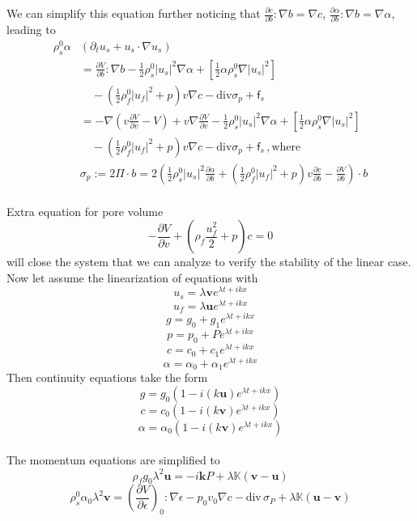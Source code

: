 \documentclass[12pt]{article}
\numberwithin{theorem}{section}
\def\div{\mbox{div}\,}
\newcommand{\pp}[2]{\frac{\partial #1}{\partial #2}}
\begin{document}
We can simplify this equation further noticing that $\pp{c}{b}: \nabla b= \nabla c$, $\pp{\alpha}{b}: \nabla b= \nabla \alpha$, leading to 
\begin{equation} 
\begin{aligned} 
\rho_s^0 \alpha & \left( \partial_t u_s + u_s \cdot \nabla u_s \right) 
\\& = 
\pp{V}{b} : \nabla b
- \frac{1}{2} \rho_s^0  |u_s|^2 \nabla \alpha
+[\frac{1}{2} \alpha \rho_s^0 \nabla |u_s|^2]
 \\& \quad 
 -\left(  \frac{1}{2} \rho_f^0  |u_f|^2 + p \right) v\nabla c- \mbox{div} \sigma_p+ \mathsf{f}_s
\\& = 
-\nabla \left(v \pp{V}{v} -V \right) + v \nabla \pp{V}{v}
- \frac{1}{2} \rho_s^0  |u_s|^2 \nabla \alpha
+[\frac{1}{2} \alpha \rho_s^0 \nabla |u_s|^2]
 \\& \quad 
 -\left(  \frac{1}{2} \rho_f^0  |u_f|^2 + p \right) v\nabla c- \mbox{div} \sigma_p+ \mathsf{f}_s \,, \mbox{where} 
 \\ 
 & \sigma_p:= 2 \Pi \cdot b = 2 \left( \frac{1}{2} \rho_s^0  |u_s|^2 \pp{\alpha}{b} +\left(  \frac{1}{2} \rho_f^0  |u_f|^2 + p \right) v\pp{c}{b} -\pp{V}{b} \right) \cdot b 
 \end{aligned} 
\label{solid_eq_1}
\end{equation} 
\\
Extra equation for pore volume
\begin{equation} 
\label{Pore_volume_eq} 
-\frac{\partial V}{\partial v} + \left(\rho_f \frac{u_f^2}{2} + p\right)c = 0
\end{equation} 
will close the system that we can analyze to verify the stability of the linear case.
\\
Now let assume the linearization of equations with
\[ u_s = \lambda \mathbf{v} e^{\lambda t + ikx} \]
\[ u_f = \lambda \mathbf{u} e^{\lambda t + ikx} \]
\[ g = g_0 + g_1 e^{\lambda t + ikx} \]
\[ p = p_0 + P e^{\lambda t + ikx} \]
\[ c = c_0 + c_1 e^{\lambda t + ikx} \]
\[ \alpha = \alpha_0 + \alpha_1 e^{\lambda t + ikx} \]
Then continuity equations take the form
\[g = g_0(1 - i(k\mathbf{u}) e^{\lambda t + ikx})\]
\[c = c_0(1 - i(k\mathbf{v}) e^{\lambda t + ikx})\]
\[\alpha = \alpha_0(1 - i(k\mathbf{v}) e^{\lambda t + ikx})\]
\\
The momentum equations are simplified to
\[\rho_f g_0 \lambda^2 \mathbf{u} = - i\mathbf{k} P  + \lambda \mathbb{K}(\mathbf{v} - \mathbf{u})\]
\[\rho_s^0 \alpha_0 \lambda^2 \mathbf{v} = \left(\pp{V}{\epsilon}\right)_0 : \nabla \epsilon - p_0 v_0 \nabla c - \div \sigma_P + \lambda \mathbb{K}(\mathbf{u} - \mathbf{v})\]
\end{document}

